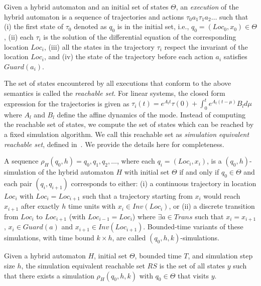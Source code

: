\begin{definition}
\label{def:hybridExecution}
Given a hybrid automaton and an initial set of states $\Theta$, an \emph{execution} of the hybrid automaton is a sequence of trajectories and actions $\tau_0 a_1 \tau_1 a_2 \ldots $ such that
%
(i) the first state of $\tau_0$ denoted as $q_0$ is in the initial set, i.e., $q_0 = (Loc_0, x_0)\in \Theta$,
%
(ii) each $\tau_i$ is the solution of the differential equation of the corresponding location $Loc_i$, 
%
(iii) all the states in the trajectory $\tau_i$ respect the invariant of the location $Loc_i$,
%
and (iv) the state of the trajectory before each action $a_i$ satisfies $Guard(a_i)$.
\end{definition}
%
The set of states encountered by all executions that conform to the above semantics is called the \emph{reachable set}.
For linear systems, the closed form expression for the trajectories is given as $\tau_i(t) = e^{A_l t}\tau(0) + \int_{0}^{t}e^{A_l (t-\mu)}B_l d\mu$
where $A_l$ and $B_l$ define the affine dynamics of the mode.
%
Instead of computing the reachable set of states, we compute the set of states which can be reached by a fixed simulation algorithm.
%
We call this reachable set as \emph{simulation equivalent reachable set}, defined in~\cite{}. We provide the details here for completeness.

\begin{definition}
\label{def:stepSim}
A sequence $\rho_{H}(q_0,h) = q_0, q_1, q_2, \ldots$, where each $q_i = (Loc_i, x_i)$, is a $(q_0, h)$-simulation of the hybrid automaton $H$ with initial set $\Theta$ if and only if $q_0 \in \Theta$ and each pair $(q_i, q_{i+1})$ corresponds to either: 
%
(i) a continuous trajectory in location $Loc_i$ with $Loc_i=Loc_{i+1}$ such that a trajectory starting from $x_i$ would reach $x_{i+1}$ after exactly $h$ time units with $x_i \in Inv(Loc_i)$, or 
%
(ii) a discrete transition from $Loc_i$ to $Loc_{i+1}$ (with $Loc_{i-1} = Loc_i$) where  $\exists a \in Trans$ such that $x_i = x_{i+1}$, $x_i \in Guard(a)$ and $x_{i+1} \in
Inv(Loc_{i+1})$.
%
Bounded-time variants of these simulations, with time bound $k\times h$, are called $(q_0, h, k)$-simulations.
\end{definition}

\begin{definition}
\label{def:simRS}
Given a hybrid automaton $H$, initial set $\Theta$, bounded time $T$, and simulation step size $h$, the simulation equivalent reachable set $RS$ is the set of all states $y$ such that there exists a simulation $\rho_{H}(q_0, h, k)$ with $q_0 \in \Theta$ that visits $y$.
\end{definition}

